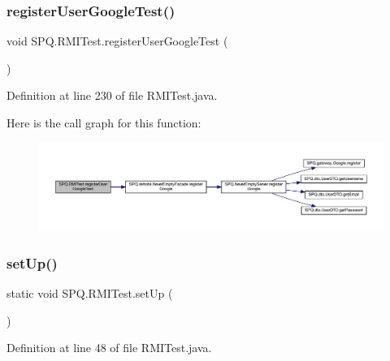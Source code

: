 \subsubsection{\texorpdfstring{register\+User\+Google\+Test()}{registerUserGoogleTest()}}
{\footnotesize\ttfamily void S\+P\+Q.\+R\+M\+I\+Test.\+register\+User\+Google\+Test (\begin{DoxyParamCaption}{ }\end{DoxyParamCaption})}



Definition at line 230 of file R\+M\+I\+Test.\+java.

Here is the call graph for this function\+:\nopagebreak
\begin{figure}[H]
\begin{center}
\leavevmode
\includegraphics[width=350pt]{class_s_p_q_1_1_r_m_i_test_a18c26a1a1882c74b0ff9a0142c9492c8_cgraph}
\end{center}
\end{figure}
\mbox{\label{class_s_p_q_1_1_r_m_i_test_ab314266e24b54a7e2f482a3a0b48edaf}} 
\subsubsection{\texorpdfstring{set\+Up()}{setUp()}}
{\footnotesize\ttfamily static void S\+P\+Q.\+R\+M\+I\+Test.\+set\+Up (\begin{DoxyParamCaption}{ }\end{DoxyParamCaption})\hspace{0.3cm}{\ttfamily [static]}}



Definition at line 48 of file R\+M\+I\+Test.\+java.

\mbox{\label{class_s_p_q_1_1_r_m_i_test_a7ec13d55d5cb3716468c3e9d7b5740d3}} 
